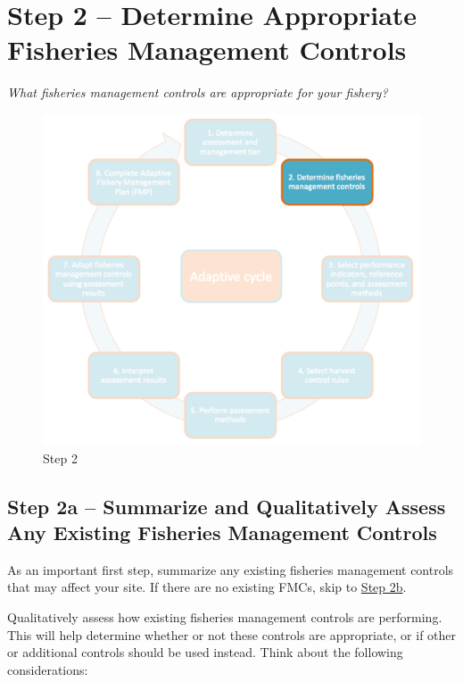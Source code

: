 \documentclass[]{book}
\begin{document}
\hypertarget{Step2}{\chapter{Step 2 -- Determine Appropriate Fisheries
Management Controls}\label{Step2}}

\emph{What fisheries management controls are appropriate for your
fishery?}

\begin{figure}
\centering
\includegraphics{myMediaFolder/media/Step2.png}
\caption{\label{fig:Step2}Step 2}
\end{figure}

\hypertarget{Step2a}{\section{Step 2a -- Summarize and Qualitatively
Assess Any Existing Fisheries Management Controls}\label{Step2a}}

As an important first step, summarize any existing fisheries management
controls that may affect your site. If there are no existing FMCs, skip
to \protect\hyperlink{Step2b}{Step 2b}.

Qualitatively assess how existing fisheries management controls are
performing. This will help determine whether or not these controls are
appropriate, or if other or additional controls should be used instead.
Think about the following considerations:
\end{document}
